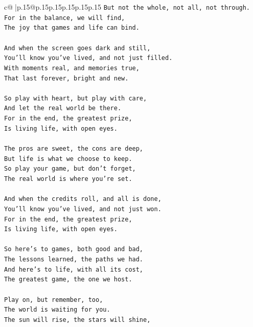 \documentclass{article}
\begin{document}
{\begin{supertabular}{c@{$\;$}|p{.15\linewidth}@{}p{.15\linewidth}p{.15\linewidth}p{.15\linewidth}p{.15\linewidth}p{.15\linewidth}}
{{{\texttt{But not the whole, not all, not through.  } \\
\texttt{For in the balance, we will find,  } \\
\texttt{The joy that games and life can bind.  } \\
\\ 
\texttt{And when the screen goes dark and still,  } \\
\texttt{You'll know you've lived, and not just filled.  } \\
\texttt{With moments real, and memories true,  } \\
\texttt{That last forever, bright and new.  } \\
\\ 
\texttt{So play with heart, but play with care,  } \\
\texttt{And let the real world be there.  } \\
\texttt{For in the end, the greatest prize,  } \\
\texttt{Is living life, with open eyes.  } \\
\\ 
\texttt{The pros are sweet, the cons are deep,  } \\
\texttt{But life is what we choose to keep.  } \\
\texttt{So play your game, but don't forget,  } \\
\texttt{The real world is where you're set.  } \\
\\ 
\texttt{And when the credits roll, and all is done,  } \\
\texttt{You'll know you've lived, and not just won.  } \\
\texttt{For in the end, the greatest prize,  } \\
\texttt{Is living life, with open eyes.  } \\
\\ 
\texttt{So here's to games, both good and bad,  } \\
\texttt{The lessons learned, the paths we had.  } \\
\texttt{And here's to life, with all its cost,  } \\
\texttt{The greatest game, the one we host.  } \\
\\ 
\texttt{Play on, but remember, too,  } \\
\texttt{The world is waiting for you.  } \\
\texttt{The sun will rise, the stars will shine,  } \\
}}}
\end{supertabular}}
\end{document}
